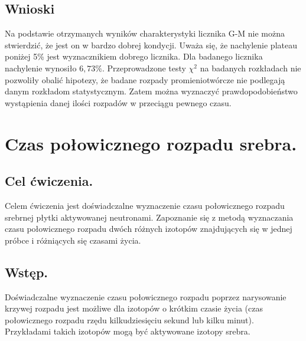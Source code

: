 \documentclass{article}
\begin{document}
\subsection{Wnioski}
Na podstawie otrzymanych wyników charakterystyki licznika G-M nie można stwierdzić, że jest on w bardzo dobrej kondycji. Uważa się, że nachylenie plateau poniżej 5\% jest wyznacznikiem dobrego licznika. Dla badanego licznika nachylenie wynosiło $6,73\%$. Przeprowadzone testy $\chi^2$ na badanych rozkładach nie pozwoliły obalić hipotezy, że badane rozpady promieniotwórcze nie podlegają danym rozkładom statystycznym. Zatem można wyznaczyć prawdopodobieństwo wystąpienia danej ilości rozpadów w przeciągu pewnego czasu.


\section{Czas połowicznego rozpadu srebra.}
\subsection{Cel ćwiczenia.}
   Celem ćwiczenia jest doświadczalne wyznaczenie czasu połowicznego rozpadu srebrnej płytki aktywowanej neutronami.
   Zapoznanie się z metodą wyznaczania czasu połowicznego rozpadu dwóch różnych izotopów znajdujących się w jednej próbce i różniących się czasami życia.

\subsection{Wstęp.}
Doświadczalne wyznaczenie czasu połowicznego rozpadu poprzez narysowanie krzywej rozpadu jest możliwe dla izotopów o krótkim czasie życia (czas połowicznego rozpadu rzędu kilkudziesięciu sekund lub kilku minut).
Przykładami takich izotopów mogą być aktywowane izotopy srebra.
\end{document}
